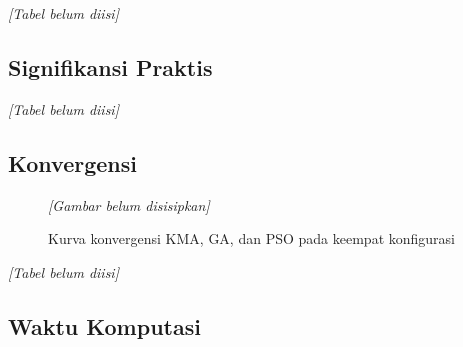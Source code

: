         \begin{table}[H]
            \centering
            \caption{Uji lanjut Dunn dengan koreksi Holm}\label{tab:dunn}
            \textit{[Tabel belum diisi]}
        \end{table}

        \subsection{Signifikansi Praktis}\label{subsec:practical significance}

        \begin{table}[H]
            \centering
            \caption{Selisih praktis, estimator Hodges–Lehmann, dan status ekivalensi}\label{tab:practical significance}
            \textit{[Tabel belum diisi]}
        \end{table}

        \subsection{Konvergensi}\label{subsec:convergence}

        \begin{figure}[H]
            \centering
            \textit{[Gambar belum disisipkan]}
            \caption{Kurva konvergensi KMA, GA, dan PSO pada keempat konfigurasi}\label{fig:convergence}
        \end{figure}

        \begin{table}[H]
            \centering
            \caption{Evaluasi saat konvergen dan perbaikan biaya 5.000 ke 25.000 evaluasi}\label{tab:convergence}
            \textit{[Tabel belum diisi]}
        \end{table}

        \subsection{Waktu Komputasi}\label{subsec:computation time}


